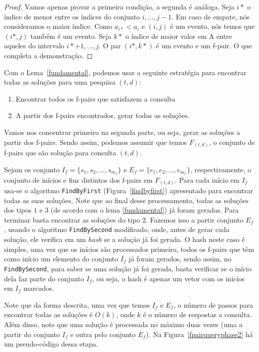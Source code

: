 \documentclass[12pt]{article}
\begin{document}
\begin{proof}
Vamos apenas provar a primeira condição, a segunda é análoga. Seja $i*$ o índice
de menor entre os índices do conjunto ${i, \ldots, j-1}$. Em caso de empate,
nós consideramos o maior índice. Como $a_{i*} < a_i$ e $(i, j)$ é um evento, nós
temos que $(i*, j)$ também é um evento. Seja $k*$ o índice de maior valor em A
entre aqueles do intervalo ${i* + 1, \ldots, j}$. O par $(i*, k*)$ é um evento
e um f-pair. O que completa a demonstração.
\end{proof}



Com o Lema~\ref{fundamental}, podemos usar a seguinte estratégia 
para encontrar todas as soluções para uma pesquisa $(t,d)$:

\begin{enumerate}
\item Encontrar todos os f-pairs que satisfazem a consulta 
\item A partir dos f-pairs encontrados, gerar todas as soluções.
\end{enumerate}

Vamos nos concentrar primeiro na segunda parte, ou seja, gerar as soluções
a partir dos f-pairs. Sendo assim, podemos assumir que temos 
$F_{(t,d)}$, o conjunto de f-pairs que são solução para
consulta $(t,d)$. 

Sejam os conjunto $I_f = \{s_1, s_2, \ldots, s_{m_s}\}$
e $E_f = \{e_1, e_2, \ldots, e_{m_e}\}$, respectivamente, o conjunto de inícios e fins distintos
dos f-pairs em $F_{(t,d)}$. Para cada início em $I_f$ usa-se o algoritmo \verb|FindByFirst| (Figura~\ref{findbyfirst})
apresentado para encontrar todas as suas soluções.  Note que ao final desse processamento, todas
as soluções dos tipos $1$ e $3$ (de acordo com o lema \ref{fundamental}) já foram geradas. Para terminar
basta encontrar as soluções do tipo $2$. Fazemos isso  a partir conjunto $E_f$, usando o algoritmo
\verb|FindBySecond| modificado, onde, antes de gerar cada solução, ele verifica em um \textit{hash} se a solução
já foi gerada. O hash neste caso é simples, uma vez que os inícios são processados primeiro, todos os
f-pairs que têm como início um elemento do conjunto $I_f$ já foram gerados, sendo assim, no \verb|FindBySecond|,
para saber se uma solução já foi gerada, basta verificar se o início dela faz parte do conjunto $I_f$, ou seja,
o hash é apenas um vetor com os inicíos em $I_f$ marcados.

Note que da forma descrita, uma vez que temos $I_f$ e $E_f$, o número de passos para encontrar todas as soluções é $O(k)$, onde $k$ é o número de respostas a consulta.
Além disso, note que uma solução é processada no máximo duas vezes (uma a partir do conjunto $I_f$ e outra pelo conjunto $E_f$).
Na Figura~\ref{fpairqueryphase2} há um pseudo-código dessa etapa.
\end{document}
